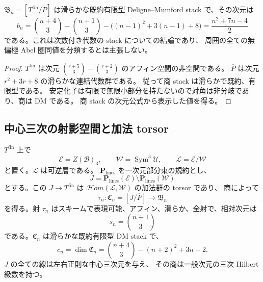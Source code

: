 \begin{theorem}[一ブロックの代数的周囲モジュライ]
\label{thm:nfm-ambient-dimension}
$\mathfrak B_n=[T^{\mathrm{fin}}/\overline P]$ は滑らかな既約有限型
Deligne--Mumford stack で、その次元は
\[
 b_n=\binom{n+4}{3}-\binom{n+1}{3}
       -\bigl((n-1)^2+3(n-1)+8\bigr)
     =\frac{n^2+7n-4}{2}
\]
である。これは次数付き代数の stack についての結論であり、
周囲の全ての無偏極 Abel 圏同値を分類するとは主張しない。
\end{theorem}

\begin{proof}
$T^{\mathrm{fin}}$ は次元
$\binom{r+5}{3}-\binom{r+2}{3}$ のアフィン空間の非空開である。
$\overline P$ は次元 $r^2+3r+8$ の滑らかな連結代数群である。
従って商 stack は滑らかで既約、有限型である。
安定化子は有限で無限小部分を持たないので対角は非分岐であり、商は DM である。
商 stack の次元公式から表示した値を得る。
\end{proof}

\subsection{中心三次の射影空間と加法 torsor}

\begin{theorem}
\label{thm:nfm-central-torsor}
$T^{\mathrm{fin}}$ 上で
\[
 \mathcal E=Z(\mathcal B)_3,\qquad
 \mathcal W=\operatorname{Sym}^3\mathcal U,\qquad
 \mathcal L=\mathcal E/\mathcal W
\]
と置く。$\mathcal L$ は可逆層である。
$\mathbf P_{\mathrm{lines}}$ を一次元部分束の規約とし、
\[
 J=\mathbf P_{\mathrm{lines}}(\mathcal E)
      \setminus\mathbf P_{\mathrm{lines}}(\mathcal W)
\]
とする。この $J\to T^{\mathrm{fin}}$ は
$\mathcal{H}om(\mathcal L,\mathcal W)$ の加法群の torsor であり、
商によって
\[
 \tau_n:\mathfrak C_n=[J/\overline P]\longrightarrow\mathfrak B_n
\]
を得る。射 $\tau_n$ はスキームで表現可能、アフィン、滑らか、全射で、相対次元は
\[
 s_n=\binom{n+1}{3}
\]
である。$\mathfrak C_n$ は滑らかな既約有限型 DM stack で、
\[
 c_n=\dim\mathfrak C_n
 =\binom{n+4}{3}-(n+2)^2+3n-2.
\]
$J$ の全ての線は左右正則な中心三次元を与え、
その商は一般次元の三次 Hilbert 級数を持つ。
\end{theorem}

